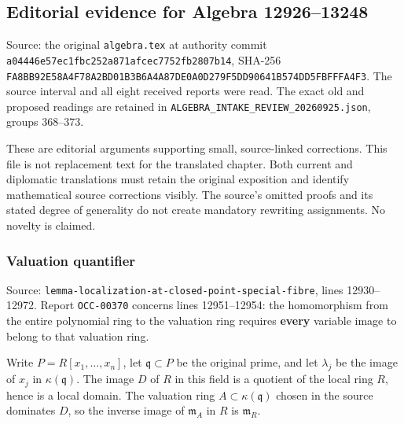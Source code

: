 \subsection{Editorial evidence for Algebra 12926--13248}\label{algebra-proof-001-editorial-evidence-for-algebra-1292613248}

Source: the original \texttt{algebra.tex} at authority commit \texttt{a044\allowbreak{}46e5\allowbreak{}7ec1\allowbreak{}fbc2\allowbreak{}52a8\allowbreak{}71af\allowbreak{}cec7\allowbreak{}752f\allowbreak{}b280\allowbreak{}7b14}, SHA-256 \texttt{FA8B\allowbreak{}B92E\allowbreak{}58A4\allowbreak{}F78A\allowbreak{}2BD0\allowbreak{}1B3B\allowbreak{}6A4A\allowbreak{}87DE\allowbreak{}0A0D\allowbreak{}279F\allowbreak{}5DD9\allowbreak{}0641\allowbreak{}B574\allowbreak{}DD5F\allowbreak{}BFFF\allowbreak{}A4F3}. The source interval and all eight received reports were read. The exact old and proposed readings are retained in \texttt{ALGEBRA\_\allowbreak{}INTAKE\_\allowbreak{}REVIEW\_\allowbreak{}20260925.\allowbreak{}json}, groups 368--373.

These are editorial arguments supporting small, source-linked corrections. This file is not replacement text for the translated chapter. Both current and diplomatic translations must retain the original exposition and identify mathematical source corrections visibly. The source's omitted proofs and its stated degree of generality do not create mandatory rewriting assignments. No novelty is claimed.

\subsubsection{Valuation quantifier}\label{algebra-proof-001-valuation-quantifier}

Source: \texttt{lemma-localization-at-closed-point-special-fibre}, lines 12930--12972. Report \texttt{OCC-00370} concerns lines 12951--12954: the homomorphism from the entire polynomial ring to the valuation ring requires \textbf{every} variable image to belong to that valuation ring.

Write \(P=R[x_1,\ldots,x_n]\), let \(\mathfrak q\subset P\) be the original prime, and let \(\lambda_j\) be the image of \(x_j\) in \(\kappa(\mathfrak q)\). The image \(D\) of \(R\) in this field is a quotient of the local ring \(R\), hence is a local domain. The valuation ring \(A\subset\kappa(\mathfrak q)\) chosen in the source dominates \(D\), so the inverse image of \(\mathfrak m_A\) in \(R\) is \(\mathfrak m_R\).

